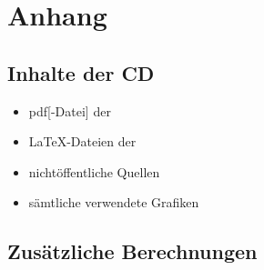 \chapter{Anhang}
\label{Anhang}

\section{Inhalte der CD}
\label{CD}
\begin{itemize}
    \item \ac{pdf}[-Datei] der \art
    \item \LaTeX-Dateien der \art
    \item nichtöffentliche Quellen
    \item sämtliche verwendete Grafiken
\end{itemize}

\section{Zusätzliche Berechnungen}
